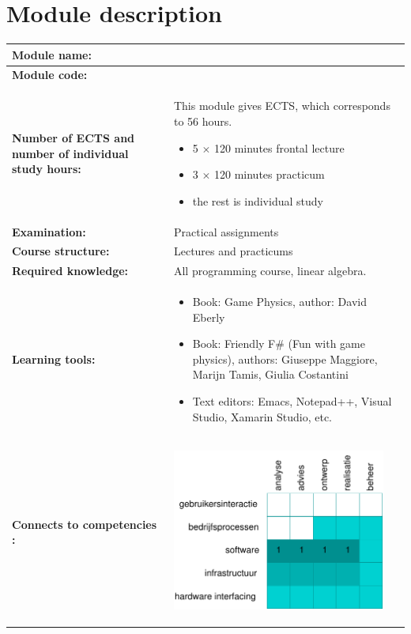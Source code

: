 \section*{Module description}
\begin{tabularx}{\textwidth}{|>{\columncolor{lichtGrijs}} p{}|X|}
	\hline
	\textbf{Module name:} & \modulenaam\\
	\hline
	\textbf{Module code: }& \modulecode\\
	\hline
	\textbf{Number of ECTS \newline and number of individual study hours:} & This module gives \stdPunten ECTS, which corresponds to 56 hours.
	\begin{itemize}
		\item 5 $\times$ 120 minutes frontal lecture
		\item 3 $\times$ 120 minutes practicum
		\item the rest is individual study
	\end{itemize} \\
	\hline
	\textbf{Examination:} & Practical assignments \\
	\hline
	\textbf{Course structure:} & Lectures and practicums \\
	\hline
	\textbf{Required knowledge:} & All programming course, linear algebra. \\
	\hline
	\textbf{Learning tools:}  &
		\begin{itemize}
			\item Book: Game Physics, author: David Eberly
			\item Book: Friendly F\# (Fun with game physics), authors: Giuseppe Maggiore, Marijn Tamis, Giulia Costantini
			\item Text editors: Emacs, Notepad++, Visual Studio, Xamarin Studio, etc.
		\end{itemize} \\
	\hline
	\textbf{Connects to \newline competencies :} &
	\begin{center}
		\includegraphics[width=7cm]{img/comptabel.pdf}
	\end{center}\\
	\hline
\end{tabularx}
\newpage

